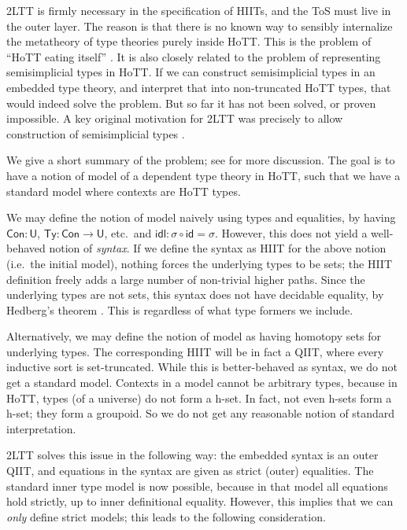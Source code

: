 \documentclass[12pt,a4paper,twoside,openany]{book}
\theoremstyle{remark}
\theoremstyle{definition}
\theoremstyle{theorem}
\newcommand{\ms}[1]{\mathsf{#1}}
\newcommand{\id}{\mathsf{id}}
\newcommand{\Con}{\mathsf{Con}}
\newcommand{\Ty}{\mathsf{Ty}}
\newcommand{\U}{\mathsf{U}}
\begin{document}
2LTT is firmly necessary in the specification of HIITs, and the ToS must live in
the outer layer. The reason is that there is no known way to sensibly
internalize the metatheory of type theories purely inside HoTT. This is the
problem of ``HoTT eating itself'' \cite{hott-eat-itself}. It is also closely
related to the problem of representing semisimplicial types in HoTT. If we can
construct semisimplicial types in an embedded type theory, and interpret that
into non-truncated HoTT types, that would indeed solve the problem. But so far
it has not been solved, or proven impossible. A key original motivation for 2LTT
was precisely to allow construction of semisimplicial types \cite{twolevel}.

We give a short summary of the problem; see \cite[Section~4]{hiits} for more
discussion. The goal is to have a notion of model of a dependent type theory in
HoTT, such that we have a standard model where contexts are HoTT types.

We may define the notion of model naively using types and equalities, by having
$\Con : \U$, $\Ty : \Con \to \U$, etc.\ and $\ms{idl} : \sigma \circ \id =
\sigma$. However, this does not yield a well-behaved notion of \emph{syntax}. If
we define the syntax as HIIT for the above notion (i.e.\ the initial model),
nothing forces the underlying types to be sets; the HIIT definition freely adds
a large number of non-trivial higher paths. Since the underlying types are not
sets, this syntax does not have decidable equality, by Hedberg's theorem
\cite{hedberg}. This is regardless of what type formers we include.

Alternatively, we may define the notion of model as having homotopy sets for
underlying types. The corresponding HIIT will be in fact a QIIT, where every
inductive sort is set-truncated. While this is better-behaved as syntax, we do
not get a standard model. Contexts in a model cannot be arbitrary types, because
in HoTT, types (of a universe) do not form a h-set. In fact, not even h-sets form
a h-set; they form a groupoid. So we do not get any reasonable notion of standard
interpretation.

2LTT solves this issue in the following way: the embedded syntax is an outer
QIIT, and equations in the syntax are given as strict (outer) equalities. The
standard inner type model is now possible, because in that model all equations
hold strictly, up to inner definitional equality. However, this implies that we
can \emph{only} define strict models; this leads to the following consideration.
\end{document}
